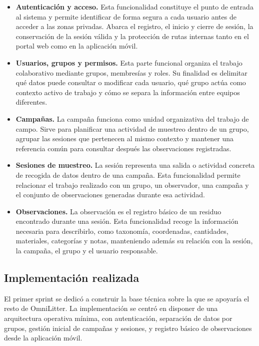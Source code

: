 \begin{itemize}[leftmargin=1.4em]
\item \textbf{Autenticación y acceso.} Esta funcionalidad constituye el punto de entrada al sistema y permite identificar de forma segura a cada usuario antes de acceder a las zonas privadas. Abarca el registro, el inicio y cierre de sesión, la conservación de la sesión válida y la protección de rutas internas tanto en el portal web como en la aplicación móvil.
\item \textbf{Usuarios, grupos y permisos.} Esta parte funcional organiza el trabajo colaborativo mediante grupos, membresías y roles. Su finalidad es delimitar qué datos puede consultar o modificar cada usuario, qué grupo actúa como contexto activo de trabajo y cómo se separa la información entre equipos diferentes.
\item \textbf{Campañas.} La campaña funciona como unidad organizativa del trabajo de campo. Sirve para planificar una actividad de muestreo dentro de un grupo, agrupar las sesiones que pertenecen al mismo contexto y mantener una referencia común para consultar después las observaciones registradas.
\item \textbf{Sesiones de muestreo.} La sesión representa una salida o actividad concreta de recogida de datos dentro de una campaña. Esta funcionalidad permite relacionar el trabajo realizado con un grupo, un observador, una campaña y el conjunto de observaciones generadas durante esa actividad.
\item \textbf{Observaciones.} La observación es el registro básico de un residuo encontrado durante una sesión. Esta funcionalidad recoge la información necesaria para describirlo, como taxonomía, coordenadas, cantidades, materiales, categorías y notas, manteniendo además su relación con la sesión, la campaña, el grupo y el usuario responsable.
\end{itemize}

\subsection{Implementación realizada}

El primer sprint se dedicó a construir la base técnica sobre la que se apoyaría
el resto de OmniLitter. La implementación se centró en disponer de una
arquitectura operativa mínima, con autenticación, separación de datos por
grupos, gestión inicial de campañas y sesiones, y registro básico de
observaciones desde la aplicación móvil.

